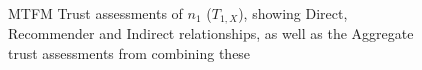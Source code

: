 \documentclass[conference]{IEEEtran}
\begin{document}
\begin{figure}[h]
  \newline
  \caption{MTFM Trust assessments of $n_1$ ($T_{1,X}$), showing Direct, Recommender and Indirect relationships, as well as the Aggregate trust assessments from combining these\protect\footnotemark} 
  \label{fig:trust_mobility}
\end{figure}
%
\end{document}
